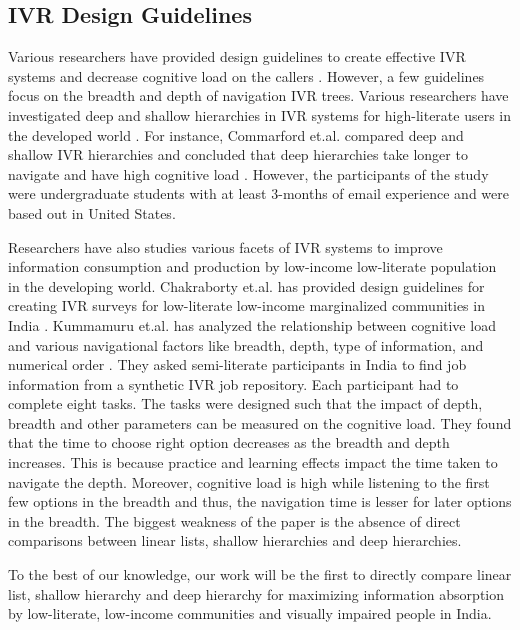 \documentclass{sigchi}
\begin{document}
\subsection{IVR Design Guidelines}
Various researchers have provided design guidelines to create effective IVR systems and decrease cognitive load on the callers	 \cite{Ndwe2008,Suhm2008,MSDNSpeech,Halstead-Nussloch1989}. However, a few guidelines focus on the breadth and depth of navigation IVR trees. Various researchers have investigated deep and shallow hierarchies in IVR systems for high-literate users in the developed world \cite{Huguenard1997,Virzi1997,Commarford2008}. For instance, Commarford et.al. compared deep and shallow IVR hierarchies and concluded that deep hierarchies take longer to navigate and have high cognitive load \cite{Commarford2008}. However, the participants of the study were undergraduate students with at least 3-months of email experience and were based out in United States. 

Researchers have also studies various facets of IVR systems to improve information consumption and production by low-income low-literate population in the developing world. Chakraborty et.al. has provided design guidelines for creating IVR surveys for low-literate low-income marginalized communities in India \cite{Chakraborty2013}. Kummamuru et.al. has analyzed the relationship between cognitive load and various navigational factors like breadth, depth, type of information, and numerical order \cite{Kummamuru2012}. They asked semi-literate participants in India to find job information from a synthetic IVR job repository. Each participant had to complete eight tasks. The tasks were designed such that the impact of depth, breadth and other parameters can be measured on the cognitive load. They found that the time to choose right option decreases as the breadth and depth increases. This is because practice and learning effects impact the time taken to navigate the depth. Moreover, cognitive load is high while listening to the first few options in the breadth and thus, the navigation time is lesser for later options in the breadth. The biggest weakness of the paper is the absence of direct comparisons between linear lists, shallow hierarchies and deep hierarchies.

To the best of our knowledge, our work will be the first to directly compare linear list, shallow hierarchy and deep hierarchy for maximizing information absorption by low-literate, low-income communities and visually impaired people in India. 
\end{document}
